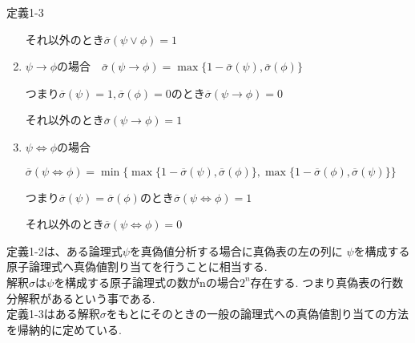 \documentclass[10pt]{jarticle}
\begin{document}
\begin{itembox}[l]{定義1-3}
\begin{enumerate}
			それ以外のとき\(\overline{\sigma}(\psi \lor \phi) = 1\)
			
			\item \(\psi \to \phi\)の場合　\(\overline{\sigma}(\psi \to \phi) = \max\{1 - \overline{\sigma}(\psi), \overline{\sigma}(\phi)\} \)
			
			つまり\(\overline{\sigma}(\psi) = 1 , \overline{\sigma}(\phi) = 0\)のとき\(\overline{\sigma}(\psi \to \phi) = 0\)
			
			それ以外のとき\(\overline{\sigma}(\psi \to \phi) = 1\)

			\item \(\psi \Leftrightarrow \phi \)の場合　
			
			\(\overline{\sigma}(\psi\Leftrightarrow\phi) = \min\{\max\{1-\overline{\sigma}(\psi),\overline{\sigma}(\phi)\},\max\{1-\overline{\sigma}(\phi) , \overline{\sigma}(\psi)\}\} \)

			つまり\(\overline{\sigma}(\psi) = \overline{\sigma}(\phi)\)のとき\(\overline{\sigma}(\psi \Leftrightarrow \phi)=1\)

			それ以外のとき\(\overline{\sigma}(\psi \Leftrightarrow \phi)=0\)
		\end{enumerate}

	\end{itembox}


	定義1-2は、ある論理式\(\psi\)を真偽値分析する場合に真偽表の左の列に
	\(\psi\)を構成する原子論理式へ真偽値割り当てを行うことに相当する. \\
	解釈\(\sigma\)は\(\psi\)を構成する原子論理式の数がnの場合\(2^n\)存在する.
	つまり真偽表の行数分解釈があるという事である.\\
	定義1-3はある解釈\(\sigma\)をもとにそのときの一般の論理式への真偽値割り当ての方法を帰納的に定めている.
	





	
\end{document}
